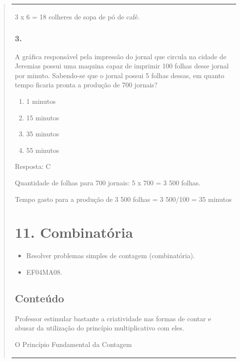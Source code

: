 \begin{enumerate}
\begin{escolha}
\begin{enumerate}
\begin{itemize}
\begin{itemize}
\begin{escolha}
\begin{quote}
\begin{escolha}
{\begin{longtable}[]{@{}l@{}}
\begin{itemize}
3 x 6 = 18 colheres de sopa de pó de café.

\subsubsection{3.}\label{section-129}

A gráfica responsável pela impressão do jornal que circula na cidade de
Jeremias possui uma maquina capaz de imprimir 100 folhas desse jornal
por minuto. Sabendo-se que o jornal possui 5 folhas dessas, em quanto
tempo ficaria pronta a produção de 700 jornais?

\begin{enumerate}
\def\labelenumi{\alph{enumi})}
\item
  1 minutos
\item
  15 minutos
\item
  35 minutos
\item
  55 minutos
\end{enumerate}

Resposta: C

Quantidade de folhas para 700 jornais: 5 x 700 = 3 500 folhas.

Tempo gasto para a produção de 3 500 folhas = 3 500/100 = 35 minutos

\section{11. Combinatória}\label{muxf3dulo-11}

{Habilidade do SAEB}

\begin{itemize}
\item Resolver problemas simples de contagem (combinatória).
\end{itemize}

{Habilidade da BNCC}

\begin{itemize}
\item EF04MA08.
\end{itemize}

\subsection{Conteúdo}\label{conteuxfado-10}

Professor estimular bastante a criatividade nas formas de contar e
abusar da utilização do princípio multiplicativo com eles.

O Princípio Fundamental da Contagem


\end{itemize}
\end{longtable}}
\end{escolha}
\end{quote}
\end{escolha}
\end{itemize}
\end{itemize}
\end{enumerate}
\end{escolha}
\end{enumerate}

